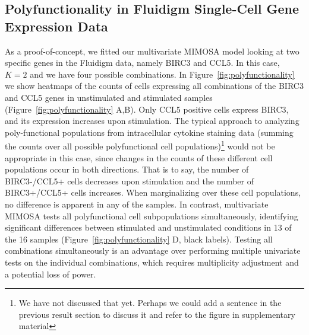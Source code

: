 \documentclass[useAMS,referee,usenatbib]{biom}
\begin{document}
\subsection{Polyfunctionality in Fluidigm Single-Cell Gene Expression Data}
As a proof-of-concept, we fitted our multivariate MIMOSA model looking at two specific genes in the Fluidigm data, namely BIRC3 and CCL5. In this case, $K=2$ and we have four possible combinations. 
In Figure~\ref{fig:polyfunctionality} we show heatmaps of the counts of cells expressing all combinations of the BIRC3 and CCL5 genes in unstimulated and stimulated samples (Figure~\ref{fig:polyfunctionality} A,B). Only CCL5 positive cells express BIRC3, and its expression increases upon stimulation. The typical approach to analyzing poly-functional populations from intracellular cytokine staining data (summing the counts over all possible polyfunctional cell populations)\footnote{We have not discussed that yet. Perhaps we could add a sentence in the previous result section to discuss it and refer to the figure in supplementary material} would not be appropriate in this case, since changes in the counts of these different cell populations occur in both directions. That is to say, the number of BIRC3-/CCL5+ cells decreases upon stimulation and the number of BIRC3+/CCL5+ cells increases. When marginalizing over these cell populations, no difference is apparent in any of the samples. In contrast, multivariate MIMOSA tests all polyfunctional cell subpopulations simultaneously, identifying significant differences between stimulated and unstimulated conditions in 13 of the 16 samples (Figure~\ref{fig:polyfunctionality} D, black labels). Testing all combinations simultaneously is an advantage over performing multiple univariate tests on the individual combinations, which requires multiplicity adjustment and a potential loss of power. 
\end{document}
